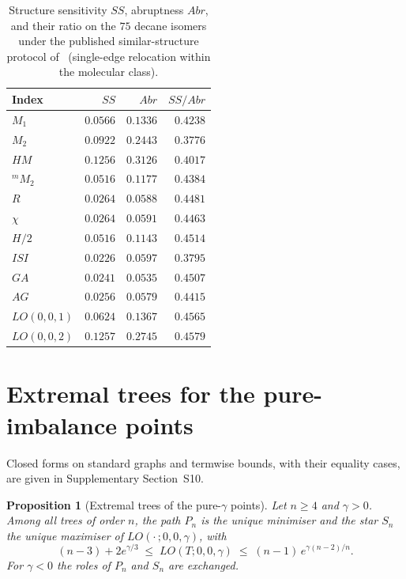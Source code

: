 \documentclass[a5paper, 10pt]{article}
\theoremstyle{plain}
\newtheorem{proposition}[theorem]{Proposition}
\theoremstyle{remark}
\theoremstyle{definition}
\begin{document}
\begin{table}[htbp]
\centering
\caption{Structure sensitivity $SS$, abruptness $Abr$, and their
ratio on the $75$ decane isomers under the published
similar-structure protocol of~\cite{FurtulaGutmanDehmer2013SS}
(single-edge relocation within the molecular class).}
\label{tab:fgdss}
\small
\begin{tabular}{lrrr}
\toprule
Index & $SS$ & $Abr$ & $SS/Abr$\\
\midrule
$M_1$ & $0.0566$ & $0.1336$ & $0.4238$\\
$M_2$ & $0.0922$ & $0.2443$ & $0.3776$\\
$HM$ & $0.1256$ & $0.3126$ & $0.4017$\\
${}^{m}\!M_2$ & $0.0516$ & $0.1177$ & $0.4384$\\
$R$ & $0.0264$ & $0.0588$ & $0.4481$\\
$\chi$ & $0.0264$ & $0.0591$ & $0.4463$\\
$H/2$ & $0.0516$ & $0.1143$ & $0.4514$\\
$ISI$ & $0.0226$ & $0.0597$ & $0.3795$\\
$GA$ & $0.0241$ & $0.0535$ & $0.4507$\\
$AG$ & $0.0256$ & $0.0579$ & $0.4415$\\
$LO(0,0,1)$ & $0.0624$ & $0.1367$ & $0.4565$\\
$LO(0,0,2)$ & $0.1257$ & $0.2745$ & $0.4579$\\
\bottomrule
\end{tabular}
\end{table}

\section{Extremal trees for the pure-imbalance points}\label{sec:bounds}\label{sec:extremal}

Closed forms on standard graphs and termwise bounds, with their equality
cases, are given in Supplementary Section~S10.

\begin{proposition}[Extremal trees of the pure-$\gamma$ points]\label{prop:extremal}
Let $n \ge 4$ and $\gamma > 0$. Among all trees of order $n$, the
path $P_n$ is the unique minimiser and the star $S_n$ the unique
maximiser of $LO(\cdot\,;0,0,\gamma)$, with
\[
(n-3) + 2e^{\gamma/3} \;\le\; LO(T;0,0,\gamma) \;\le\; (n-1)\,e^{\gamma(n-2)/n}.
\]
For $\gamma < 0$ the roles of $P_n$ and $S_n$ are exchanged.
\end{proposition}
\end{document}
